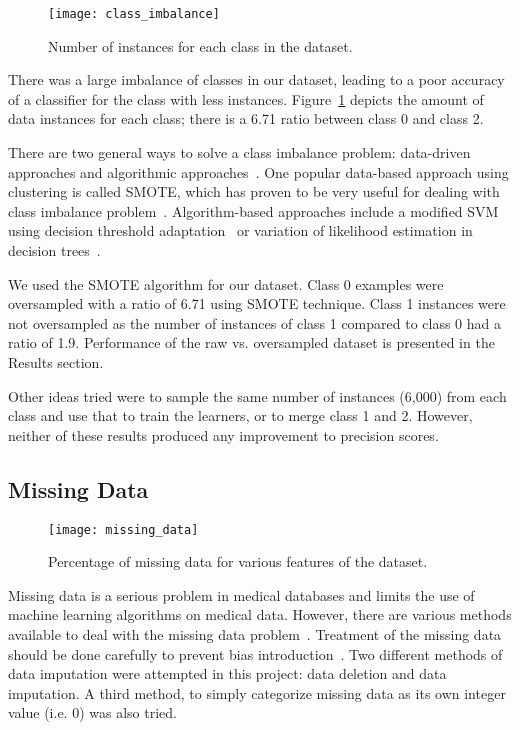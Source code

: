 \documentclass[conference]{IEEEtran}
\begin{document}
\begin{figure}[htpb]
	\centering
	\texttt{[image: class\_imbalance]}
	\caption{Number of instances for each class in the dataset.}
	\label{fig:class_imbalance}
\end{figure}

There was a large imbalance of classes in our dataset, leading to a poor accuracy of a classifier for the class with less instances. Figure~\ref{fig:class_imbalance} depicts the amount of data instances for each class; there is a 6.71 ratio between class 0 and class 2.

There are two general ways to solve a class imbalance problem: data-driven approaches and algorithmic approaches~\cite{purwar-2014}. One popular data-based approach using clustering is called SMOTE, which has proven to be very useful for dealing with class imbalance problem~\cite{smote-2012}. Algorithm-based approaches include a modified SVM using decision threshold adaptation~\cite{wu-2003, raskutti-2004} or variation of likelihood estimation in decision trees~\cite{weiss-2003}.

We used the SMOTE algorithm for our dataset. Class 0 examples were oversampled with a ratio of 6.71 using SMOTE technique. Class 1 instances were not oversampled as the number of instances of class 1 compared to class 0 had a ratio of 1.9. Performance of the raw vs. oversampled dataset is presented in the Results section.

Other ideas tried were to sample the same number of instances (6,000) from each class and use that to train the learners, or to merge class 1 and 2. However, neither of these results produced any improvement to precision scores.

\subsection{Missing Data}

\begin{figure}[htpb]
	\centering
	\texttt{[image: missing\_data]}
	\caption{Percentage of missing data for various features of the dataset.}
	\label{fig:missing_data}
\end{figure}


Missing data is a serious problem in medical databases and limits the use of machine learning algorithms on medical data. However, there are various methods available to deal with the missing data problem~\cite{imputation-96}. Treatment of the missing data should be done carefully to prevent bias introduction~\cite{gustavo-2003}. Two different methods of data imputation were attempted in this project: data deletion and data imputation. A third method, to simply categorize missing data as its own integer value (i.e. 0) was also tried.
\end{document}
